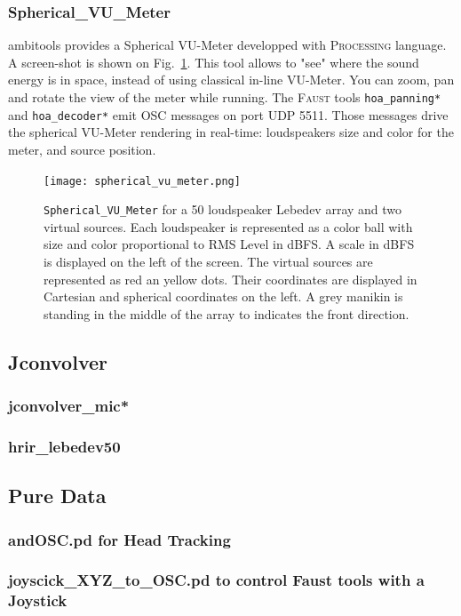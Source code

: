 \documentclass[10pt,a4paper]{article}
\begin{document}
\subsubsection{Spherical\_VU\_Meter}
\label{sec:processing}
ambitools provides a Spherical VU-Meter developped with \textsc{Processing} language. A screen-shot is shown on Fig.~\ref{fig:spherical_vu_meter}. This tool allows to "see" where the sound energy is in space, instead of using classical in-line VU-Meter. You can zoom, pan and rotate the view of the meter while running. The \textsc{Faust} tools \lstinline'hoa_panning*' and \lstinline'hoa_decoder*' emit \textsc{OSC} messages on port UDP 5511. Those messages drive the spherical VU-Meter rendering in real-time: loudspeakers size and color for the meter, and source position.
\begin{figure}[!ht]
\centering
\texttt{[image: spherical\_vu\_meter.png]}
\caption{\lstinline'Spherical_VU_Meter' for a 50 loudspeaker Lebedev array and two virtual sources. Each loudspeaker is represented as a color ball with size and color proportional to RMS Level in dBFS. A scale in dBFS is displayed on the left of the screen. The virtual sources are represented as red an yellow dots. Their coordinates are displayed in Cartesian and spherical coordinates on the left. A grey manikin is standing in the middle of the array to indicates the front direction.}
\label{fig:spherical_vu_meter}
\end{figure}

\pagebreak
\subsection{Jconvolver}
\label{sec:jconvolver}
\subsubsection{jconvolver\_mic*}
\subsubsection{hrir\_lebedev50}

\subsection{Pure Data}
\subsubsection{andOSC.pd for Head Tracking}
\label{sec:andOSC}
\subsubsection{joyscick\_XYZ\_to\_OSC.pd to control Faust tools with a Joystick}
\end{document}
